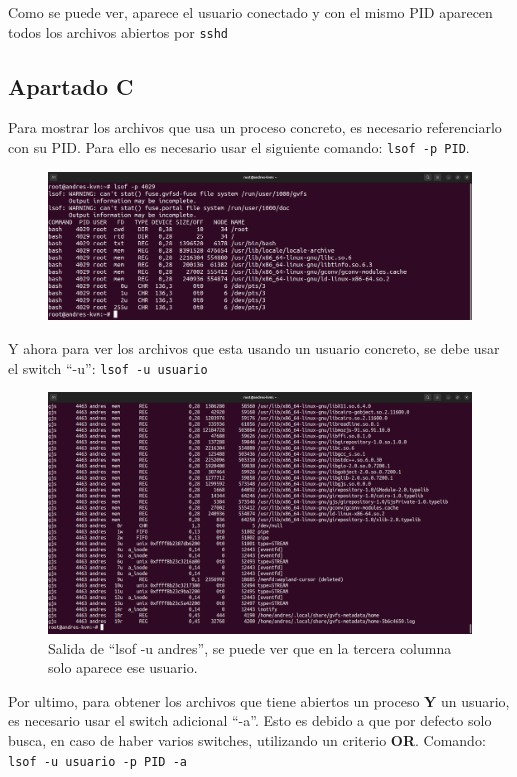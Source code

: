 \documentclass{article}
\begin{document}
Como se puede ver, aparece el usuario conectado y con el mismo PID aparecen todos los archivos abiertos por \verb|sshd|


\subsection*{Apartado C}
Para mostrar los archivos que usa un proceso concreto, es necesario referenciarlo con su PID. Para ello es necesario usar el siguiente comando: \verb|lsof -p PID|.

\begin{figure}[H]
    \includegraphics[width=\textwidth]{imagenes/lsofp.png}
\end{figure} 

Y ahora para ver los archivos que esta usando un usuario concreto, se debe usar el switch ``-u'': \verb|lsof -u usuario|

\begin{figure}[H]
    \includegraphics[width=\textwidth]{imagenes/lsofuandres.png}
    \caption{Salida de ``lsof -u andres'', se puede ver que en la tercera columna solo aparece ese usuario.}
\end{figure}

Por ultimo, para obtener los archivos que tiene abiertos un proceso \textbf{Y} un usuario, es necesario usar el switch adicional ``-a''. Esto es debido a que por defecto solo busca, en caso de haber varios switches, utilizando un criterio \textbf{OR}. Comando: \verb|lsof -u usuario -p PID -a|
\end{document}
